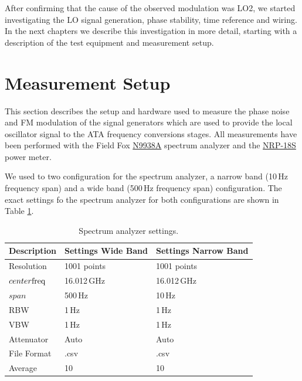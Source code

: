 \documentclass[12pt]{article}
\begin{document}
After confirming that the cause of the observed modulation was LO2, we started investigating the LO signal generation, phase stability, time reference and wiring. In the next chapters we describe this investigation in more detail, starting with a description of the test equipment and measurement setup.



\section{Measurement Setup}
\label{sec:2}

This section describes the setup and hardware used to measure the phase noise and FM modulation of the signal generators which are used to provide the local oscillator signal to the ATA frequency conversions stages.
All measurements have been performed with the Field Fox \href{https://www.keysight.com/en/pdx-x201933-pn-N9938A/fieldfox-handheld-microwave-spectrum-analyzer-265-ghz?pm=spc&nid=-32495.1150527&cc=US&lc=eng}{N9938A} spectrum analyzer and the \href{https://www.rohde-schwarz.com/us/product/nrp_s_sn-productstartpage_63493-99587.html}{NRP-18S} power meter. 

We used to two configuration for the spectrum analyzer, a narrow band (10\,Hz frequency span) and a wide band (500\,Hz frequency span) configuration. The exact settings fo the spectrum analyzer for both configurations are shown in Table \ref{tab:spectrumanalyzer}.


\begin{table}[H]
\caption{Spectrum analyzer settings.} %
\centering
\begin{tabular}{l | l|l} \hline\hline
Description & Settings Wide Band & Settings Narrow Band 
\\ [0.5ex]
\hline %
Resolution			& 1001 points 	& 1001 points\\
$center{\rm{freq}}$		& 16.012\,GHz 	& 16.012\,GHz\\
$span$				& 500\,Hz 		& 10\,Hz\\
RBW					& 1\,Hz 		& 1\,Hz\\
VBW		 			& 1\,Hz 		& 1\,Hz\\
Attenuator				& Auto 		& Auto\\
File Format			& .csv 		& .csv\\
Average             		& 10 			& 10\\
\hline 
\end{tabular}
\label{tab:spectrumanalyzer}
\end{table}
\end{document}
